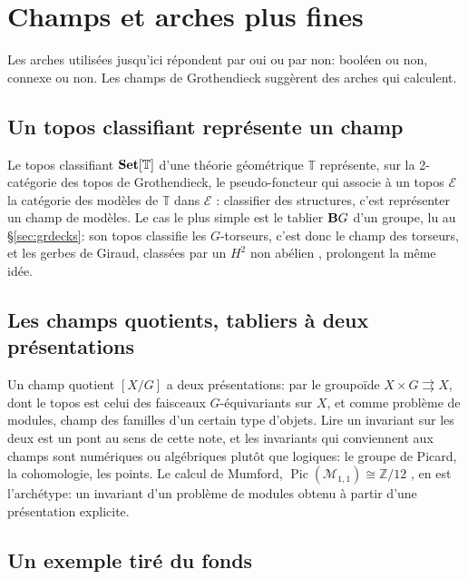 \section{Champs et arches plus fines}\label{sec:stacks}

Les arches utilisées jusqu'ici répondent par oui ou par non: booléen ou non, connexe ou non. Les champs de Grothendieck suggèrent des arches qui calculent.

\subsection{Un topos classifiant représente un champ}

Le topos classifiant $\mathbf{Set}[\mathbb T]$ d'une théorie géométrique $\mathbb T$ représente, sur la 2-catégorie des topos de Grothendieck, le pseudo-foncteur qui associe à un topos $\mathcal E$ la catégorie des modèles de $\mathbb T$ dans $\mathcal E$ \cite{caramello-tst}: classifier des structures, c'est représenter un champ de modèles. Le cas le plus simple est le tablier $\mathbf{B} G$ d'un groupe, lu au \S\ref{sec:grdecks}: son topos classifie les $G$-torseurs, c'est donc le champ des torseurs, et les gerbes de Giraud, classées par un $H^2$ non abélien \cite{giraud}, prolongent la même idée.

\subsection{Les champs quotients, tabliers à deux présentations}

Un champ quotient $[X/G]$ a deux présentations: par le groupoïde $X\times G\rightrightarrows X$, dont le topos est celui des faisceaux $G$-équivariants sur $X$, et comme problème de modules, champ des familles d'un certain type d'objets. Lire un invariant sur les deux est un pont au sens de cette note, et les invariants qui conviennent aux champs sont numériques ou algébriques plutôt que logiques: le groupe de Picard, la cohomologie, les points. Le calcul de Mumford, $\operatorname{Pic}(\mathcal M_{1,1})\cong\mathbb Z/12$ \cite{mumford}, en est l'archétype: un invariant d'un problème de modules obtenu à partir d'une présentation explicite.

\subsection{Un exemple tiré du fonds}

